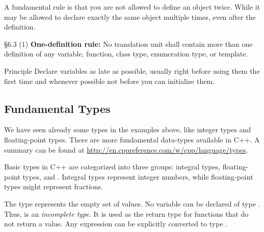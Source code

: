 A fundamental rule is that you are not allowed to define an object twice. While it may be allowed to declare exactly the same object multiple times, even after the definition.

\begin{standard}{\S 6.3 (1)}
  \textbf{One-definition rule:} No translation unit shall contain more than one definition of any variable, function, class type, enumeration type, or template.
\end{standard}


\begin{guideline}{Principle}
  Declare variables as late as possible, usually right before using them the first time and whenever possible not before you can initialize them.
\end{guideline}

\subsection{Fundamental Types\label{sec:fundamental-type}}
We have seen already some types in the examples above, like integer types and floating-point types. There are more fundamental data-types available in C++. A summary can be found at \url{http://en.cppreference.com/w/cpp/language/types}.

Basic types in C++ are categorized into three groups: integral types, floating-point types, and . Integral types represent integer numbers, while floating-point types might represent fractions.

The type  represents the empty set of values. No variable can be declared of type . Thus,  is an \emph{incomplete type}. It is used as the return type for functions that do not return a value. Any expression can be explicitly converted to type .

